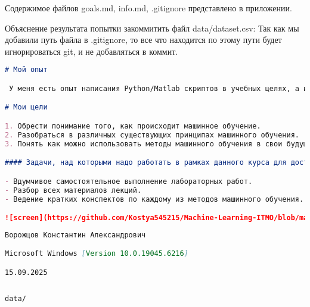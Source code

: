 \documentclass[a4paper, 12pt]{extarticle}
\theoremstyle{definition}
\theoremstyle{plain}
\theoremstyle{remark}
\begin{document}
Содержимое файлов goals.md, info.md, .gitignore представлено в приложении.

Объяснение результата попытки закоммитить файл data/dataset.csv: Так как мы добавили путь файла в .gitignore, то все что находится по этому пути будет игнорироваться git, и не добавляться в коммит.

\newpage
\begin{lstlisting}[language=markdown, caption = {Содержимое файла goals.md }]
# Мой опыт

 У меня есть опыт написания Python/Matlab скриптов в учебных целях, а именно для решения задач численного моделирования, математической оптимизации и Фурье анализа. Есть опыт создания модели [трехфазного инвертора](https://sibcontact.com/eshop/preobrazovateli-napryazheniya/vhodnoe-napryazhenie-12v/is3-12-600-invertor-dc-ac-12-v-600-vt/?utm_source=yandex&utm_medium=cpc&utm_campaign=kry_dpo_obshaja_poisk&utm_content=ch_yandex_direct%7Ccid_114689624%7Cgid_5498556019%7Cad_1855295429420572829%7Cph_53243354126%7Ccrt_0%7Cpst_premium%7Cps_2%7Csrct_search%7Csrc_none%7Cdevt_desktop%7Cret_53243354126%7Cgeo_2%7Ccf_0%7Cint_%7Ctgt_53243354126%7Cadd_no%7Cdop_&utm_term=---autotargeting&ybaip=1&yclid=14699200476502294527) с использованием Simulink.

# Мои цели

1. Обрести понимание того, как происходит машинное обучение.
2. Разобраться в различных существующих принципах машинного обучения.
3. Понять как можно использовать методы машинного обучения в свои будущих проектах.

#### Задачи, над которыми надо работать в рамках данного курса для достижения поставленных целей.

- Вдумчивое самостоятельное выполнение лабораторных работ.
- Разбор всех материалов лекций.
- Ведение кратких конспектов по каждому из методов машинного обучения.

![screen](https://github.com/Kostya545215/Machine-Learning-ITMO/blob/main/resources/schema11.jpg)
\end{lstlisting}

\begin{lstlisting}[language = md, caption ={Содержимое файла info.md}]
 Ворожцов Константин Александрович 

Microsoft Windows [Version 10.0.19045.6216]

15.09.2025
    
\end{lstlisting}

\begin{lstlisting}[language = md, caption ={Содержимое файла .gitignore}]
data/
\end{lstlisting}
\end{document}
